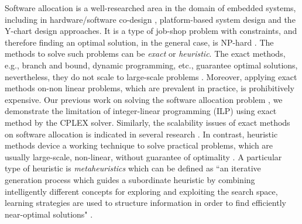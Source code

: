 Software allocation is a well-researched area in the domain of embedded systems, including in hardware/software co-design \cite{Wolf2003ACodesign}, platform-based system design \cite{Sangiovanni-Vincentelli2004BenefitsDesign} and the Y-chart design \cite{ychart_Kienhuis2002} approaches. It is a type of job-shop problem with constraints, and therefore finding an optimal solution, in the general case, is  NP-hard \cite{Fernandez-Baca1989AllocatingSystem}. The methods to solve such problems can be \textit{exact} or \textit{heuristic}. The exact methods, e.g., branch and bound, dynamic programming, etc., guarantee optimal solutions, nevertheless, they do not scale to large-scale problems \cite{Saidi2015AnArchitectures}. Moreover, applying exact methods on-non linear problems, which are prevalent in practice, is prohibitively expensive. Our previous work on solving the software allocation problem \cite{Mahmud5222}, we demonstrate the limitation of integer-linear programming (ILP) \cite{Bradley1977AppliedProgramming} using exact method by the CPLEX solver. Similarly, the scalability issues of exact methods on software allocation is indicated in several research \cite{Saidi2015AnArchitectures}. In contrast, heuristic methods device a working technique to solve practical problems, which are usually large-scale, non-linear, without guarantee of optimality \cite{faragardi2018AECUs,Bucaioni2018MoVES:Systems}.  A particular type of heuristic is \textit{metaheuristics} which can be defined as ``an iterative generation process which guides a subordinate heuristic by combining intelligently different concepts for exploring and exploiting the search space, learning strategies are used to structure information in order to
find efficiently near-optimal solutions" \cite{Osman2005Metaheuristics:Bibliography}.

